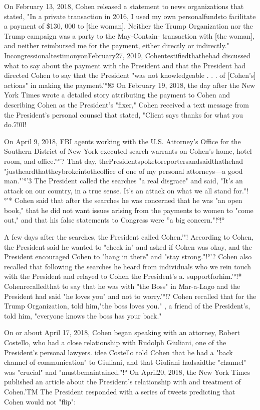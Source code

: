 On February 13, 2018, Cohen released a statement to news organizations that stated, "In a private transaction in 2016, I used my own personalfundsto facilitate a payment of \$130, 000 to [the woman].
Neither the Trump Organization nor the Trump campaign was a party to the May-Contain- transaction with [the woman], and neither reimbursed me for the payment, either directly or indirectly."
IncongressionaltestimonyonFebruary27, 2019, Cohentestifiedthathehad discussed what to say about the payment with the President and that the President had directed Cohen to say that the President "was not knowledgeable . . . of [Cohen's] actions" in making the payment.'°!©
On February 19, 2018, the day after the New York Times wrote a detailed story attributing the payment to Cohen and describing Cohen as the President's "fixer," Cohen received a text message from the President's personal counsel that stated, "Client says thanks for what you do.7!0l!

On April 9, 2018, FBI agents working with the U.S. Attorney's Office for the Southern District of New York executed search warrants on Cohen's home, hotel room, and office.'°'?
That day, thePresidentspoketoreportersandsaidthathehad "justheardthattheybrokeintotheoffice of one of my personal attorneys—a good man."'°'3
The President called the searches "a real disgrace" and said, "It's an attack on our country, in a true sense.
It's an attack on what we all stand for."!°'*
Cohen said that after the searches he was concerned that he was "an open book," that he did not want issues arising from the payments to women to "come out," and that his false statements to Congress were ''a big concern."!°!°

A few days after the searches, the President called Cohen.'"!
According to Cohen, the President said he wanted to "check in" and asked if Cohen was okay, and the President encouraged Cohen to "hang in there" and "stay strong."!°'?
Cohen also recalled that following the searches he heard from individuals who we rein touch with the President and relayed to Cohen the President's
a.
supportforhim.'°!* Cohenrecalledthat
to say that he was with "the Boss" in Mar-a-Lago and the President had said "he loves you" and not to worry.'°!?
Cohen recalled that for the Trump Organization, told him,"the boss loves you." , a friend of the President's, told him, "everyone knows the boss has your back."

On or about April 17, 2018, Cohen began speaking with an attorney, Robert Costello, who had a close relationship with Rudolph Giuliani, one of the President's personal lawyers.
idee Costello told Cohen that he had a "back channel of communication" to Giuliani, and that Giuliani hadsaidthe "channel" was "crucial" and "mustbemaintained."!°
On April20, 2018, the New York Times published an article about the President's relationship with and treatment of Cohen.'TM The President responded with a series of tweets predicting that Cohen would not "flip":

